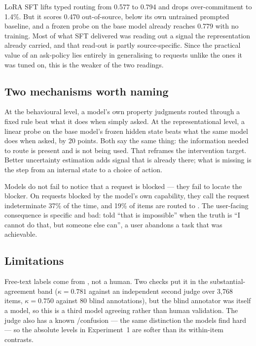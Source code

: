  LoRA SFT lifts typed
routing from 0.577 to 0.794 and drops over-commitment to 1.4\%. But it scores 0.470 out-of-source,
below its own untrained prompted baseline, and a frozen probe on the base model already reaches
0.779 with no training. Most of what SFT delivered was reading out a signal the representation
already carried, and that read-out is partly source-specific. Since the practical value of an
ask-policy lies entirely in generalising to requests unlike the ones it was tuned on, this is the
weaker of the two readings.

\subsection{Two mechanisms worth naming}

 At the behavioural level, a model's own property
judgments routed through a fixed rule beat what it does when simply asked. At the representational
level, a linear probe on the base model's frozen hidden state beats what the same model does when
asked, by 20 points. Both say the same thing: the information needed to route is present and is not
being used. That reframes the intervention target. Better uncertainty estimation adds signal that
is already there; what is missing is the step from an internal state to a choice of action.

 Models do not fail to notice that a request is
blocked --- they fail to locate the blocker. On requests blocked by the model's own capability, they
call the request indeterminate 37\% of the time, and 19\% of  items are routed to .
The user-facing consequence is specific and bad: told ``that is impossible'' when the truth is
``I cannot do that, but someone else can'', a user abandons a task that was achievable.

\subsection{Limitations}
\label{sec:threats}

 Free-text labels come from \qwenjudge, not a human. Two checks put it
in the substantial-agreement band ($\kappa = 0.781$ against an independent second judge over 3{,}768
items, $\kappa = 0.750$ against 80 blind annotations), but the blind annotator was itself a model,
so this is a third model agreeing rather than human validation. The judge also has a known
/ confusion --- the same distinction the models find hard --- so the absolute levels in
Experiment~1 are softer than its within-item contrasts.

